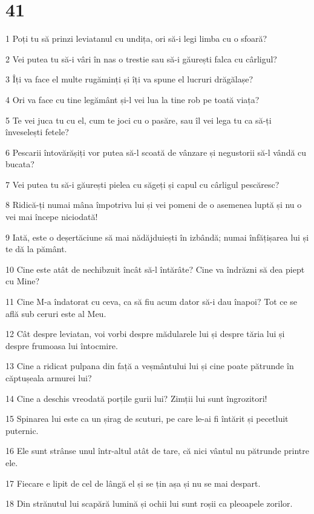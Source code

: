 \chapter{41}

\par 1 Poți tu să prinzi leviatanul cu undița, ori să-i legi limba cu o sfoară?
\par 2 Vei putea tu să-i vâri în nas o trestie sau să-i găurești falca cu cârligul?
\par 3 Îți va face el multe rugăminți și îți va spune el lucruri drăgălașe?
\par 4 Ori va face cu tine legământ și-l vei lua la tine rob pe toată viața?
\par 5 Te vei juca tu cu el, cum te joci cu o pasăre, sau îl vei lega tu ca să-ți înveselești fetele?
\par 6 Pescarii întovărășiți vor putea să-l scoată de vânzare și negustorii să-l vândă cu bucata?
\par 7 Vei putea tu să-i găurești pielea cu săgeți și capul cu cârligul pescăresc?
\par 8 Ridică-ți numai mâna împotriva lui și vei pomeni de o asemenea luptă și nu o vei mai începe niciodată!
\par 9 Iată, este o deșertăciune să mai nădăjduiești în izbândă; numai înfățișarea lui și te dă la pământ.
\par 10 Cine este atât de nechibzuit încât să-l întărâte? Cine va îndrăzni să dea piept cu Mine?
\par 11 Cine M-a îndatorat cu ceva, ca să fiu acum dator să-i dau înapoi? Tot ce se află sub ceruri este al Meu.
\par 12 Cât despre leviatan, voi vorbi despre mădularele lui și despre tăria lui și despre frumoasa lui întocmire.
\par 13 Cine a ridicat pulpana din față a veșmântului lui și cine poate pătrunde în căptușeala armurei lui?
\par 14 Cine a deschis vreodată porțile gurii lui? Zimții lui sunt îngrozitori!
\par 15 Spinarea lui este ca un șirag de scuturi, pe care le-ai fi întărit și pecetluit puternic.
\par 16 Ele sunt strânse unul într-altul atât de tare, că nici vântul nu pătrunde printre ele.
\par 17 Fiecare e lipit de cel de lângă el și se țin așa și nu se mai despart.
\par 18 Din strănutul lui scapără lumină și ochii lui sunt roșii ca pleoapele zorilor.
